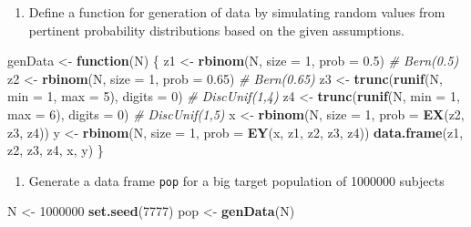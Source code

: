 \documentclass[
]{book}
\newenvironment{Shaded}{\begin{snugshade}}{\end{snugshade}}
\newcommand{\AttributeTok}[1]{\textcolor[rgb]{0.13,0.29,0.53}{#1}}
\newcommand{\CommentTok}[1]{\textcolor[rgb]{0.56,0.35,0.01}{\textit{#1}}}
\newcommand{\ControlFlowTok}[1]{\textcolor[rgb]{0.13,0.29,0.53}{\textbf{#1}}}
\newcommand{\DecValTok}[1]{\textcolor[rgb]{0.00,0.00,0.81}{#1}}
\newcommand{\FloatTok}[1]{\textcolor[rgb]{0.00,0.00,0.81}{#1}}
\newcommand{\FunctionTok}[1]{\textcolor[rgb]{0.13,0.29,0.53}{\textbf{#1}}}
\newcommand{\NormalTok}[1]{#1}
\newcommand{\OtherTok}[1]{\textcolor[rgb]{0.56,0.35,0.01}{#1}}
\providecommand{\tightlist}{%
  \setlength{\itemsep}{0pt}\setlength{\parskip}{0pt}}
\begin{document}
\begin{enumerate}
\def\labelenumi{\arabic{enumi}.}
\setcounter{enumi}{1}
\tightlist
\item
  Define a function for generation of data by simulating random values
  from pertinent probability distributions based on the given
  assumptions.
\end{enumerate}

\begin{Shaded}
\begin{Highlighting}[]
\NormalTok{genData }\OtherTok{\textless{}{-}} \ControlFlowTok{function}\NormalTok{(N) \{}
\NormalTok{  z1 }\OtherTok{\textless{}{-}} \FunctionTok{rbinom}\NormalTok{(N, }\AttributeTok{size =} \DecValTok{1}\NormalTok{, }\AttributeTok{prob =} \FloatTok{0.5}\NormalTok{) }\CommentTok{\# Bern(0.5)}
\NormalTok{  z2 }\OtherTok{\textless{}{-}} \FunctionTok{rbinom}\NormalTok{(N, }\AttributeTok{size =} \DecValTok{1}\NormalTok{, }\AttributeTok{prob =} \FloatTok{0.65}\NormalTok{) }\CommentTok{\# Bern(0.65)}
\NormalTok{  z3 }\OtherTok{\textless{}{-}} \FunctionTok{trunc}\NormalTok{(}\FunctionTok{runif}\NormalTok{(N, }\AttributeTok{min =} \DecValTok{1}\NormalTok{, }\AttributeTok{max =} \DecValTok{5}\NormalTok{), }\AttributeTok{digits =} \DecValTok{0}\NormalTok{) }\CommentTok{\# DiscUnif(1,4)}
\NormalTok{  z4 }\OtherTok{\textless{}{-}} \FunctionTok{trunc}\NormalTok{(}\FunctionTok{runif}\NormalTok{(N, }\AttributeTok{min =} \DecValTok{1}\NormalTok{, }\AttributeTok{max =} \DecValTok{6}\NormalTok{), }\AttributeTok{digits =} \DecValTok{0}\NormalTok{) }\CommentTok{\# DiscUnif(1,5)}
\NormalTok{  x }\OtherTok{\textless{}{-}} \FunctionTok{rbinom}\NormalTok{(N, }\AttributeTok{size =} \DecValTok{1}\NormalTok{, }\AttributeTok{prob =} \FunctionTok{EX}\NormalTok{(z2, z3, z4))}
\NormalTok{  y }\OtherTok{\textless{}{-}} \FunctionTok{rbinom}\NormalTok{(N, }\AttributeTok{size =} \DecValTok{1}\NormalTok{, }\AttributeTok{prob =} \FunctionTok{EY}\NormalTok{(x, z1, z2, z3, z4))}
  \FunctionTok{data.frame}\NormalTok{(z1, z2, z3, z4, x, y)}
\NormalTok{\}}
\end{Highlighting}
\end{Shaded}

\begin{enumerate}
\def\labelenumi{\arabic{enumi}.}
\setcounter{enumi}{2}
\tightlist
\item
  Generate a data frame \texttt{pop} for a big target population of 1000000
  subjects
\end{enumerate}

\begin{Shaded}
\begin{Highlighting}[]
\NormalTok{N }\OtherTok{\textless{}{-}} \DecValTok{1000000}
\FunctionTok{set.seed}\NormalTok{(}\DecValTok{7777}\NormalTok{)}
\NormalTok{pop }\OtherTok{\textless{}{-}} \FunctionTok{genData}\NormalTok{(N)}
\end{Highlighting}
\end{Shaded}
\end{document}
